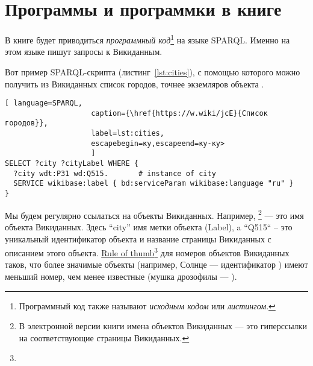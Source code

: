 \chapter{Программы и программки в книге}
\label{ch:listing_about}

В книге будет приводиться \emph{программный код}\footnote[][0cm]{
    Программный код также называют  \emph{исходным кодом} или 
    \emph{листингом}.%
%   
} на языке SPARQL. 
Именно на этом языке пишут запросы к Викиданным.


Вот пример SPARQL-скрипта (листинг~\ref{lst:cities}), 
с помощью которого можно получить из Викиданных список городов, 
точнее экземляров объекта  
.

\begin{lstlisting}[ language=SPARQL, 
                    caption={\href{https://w.wiki/jcE}{Список городов}},
                    label=lst:cities, 
                    escapebegin=ку,escapeend=ку-ку>
                    ]
SELECT ?city ?cityLabel WHERE {
  ?city wdt:P31 wd:Q515.       # instance of city
  SERVICE wikibase:label { bd:serviceParam wikibase:language "ru" }
}
\end{lstlisting}


Мы будем регулярно ссылаться на объекты Викиданных. 
Например, \footnote[][0cm]{%
%    
    В электронной версии книги имена объектов Викиданных --- 
    это гиперссылки на соответствующие страницы Викиданных.
} 
--- это имя объекта Викиданных. 
Здесь ``city'' имя метки объекта (Label), 
a ``Q515`` -- это уникальный идентификатор объекта 
и название страницы Викиданных с описанием этого объекта.
\href{https://en.wikipedia.org/wiki/Rule_of_thumb}{Rule of thumb}\footnote[][0cm]{%
%
} 
для номеров объектов Викиданных таков, что более значимые объекты 
(например, Солнце --- идентификатор ) 
имеют меньший номер, чем менее известные
(мушка дрозофилы --- ).
